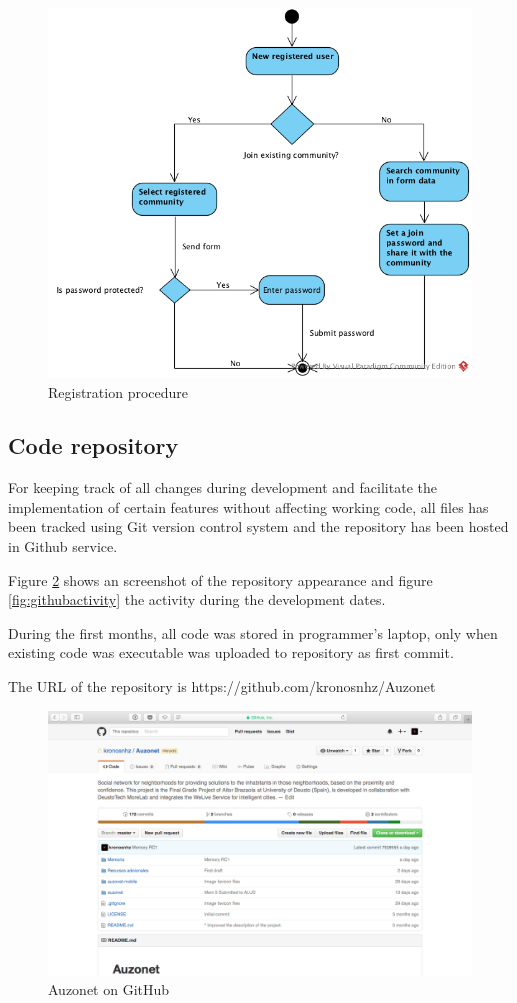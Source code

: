 \documentclass{DeustoFDP}
\begin{document}
\begin{figure}[h!]
\centering
\includegraphics[width=0.7\linewidth]{fig/Registerflow}
\caption[Registration procedure]{Registration procedure}
\label{fig:Registerflow}
\end{figure}

\newpage
\subsection{Code repository}
For keeping track of all changes during development and facilitate the implementation of certain features without affecting working code, all files has been tracked using Git version control system and the repository has been hosted in Github service.

Figure \ref{fig:githubhome} shows an screenshot of the repository appearance and figure \ref{fig:githubactivity} the activity during the development dates.

During the first months, all code was stored in programmer's laptop, only when existing code was executable was uploaded to repository as first commit.

The URL of the repository is https://github.com/kronosnhz/Auzonet

\begin{figure}[h!]
\centering
\includegraphics[width=0.8\linewidth]{fig/githubhome}
\caption[Auzonet on GitHub]{Auzonet on GitHub}
\label{fig:githubhome}
\end{figure}
\end{document}
